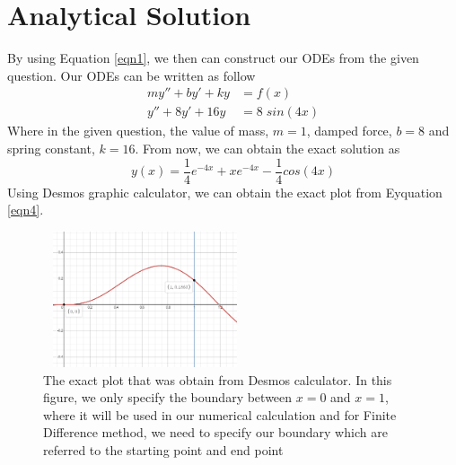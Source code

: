 \documentclass[a4paper,11.5 pt]{article}
\begin{document}
\section{Analytical Solution}
By using Equation \ref{eqn1}, we then can construct our ODEs from the given question. Our ODEs can be written as follow
\begin{align}
    my'' + by' + ky &= f(x)\\
    y'' + 8y' + 16y &= 8\;sin(4x) \label{eqn3}
\end{align}
Where in the given question, the value of mass, $m = 1$, damped force, $b = 8$ and spring constant, $k = 16$. From now, we can obtain the exact solution as
\begin{equation}\label{eqn4}
    y(x) = \frac{1}{4}e^{-4x} + xe^{-4x} - \frac{1}{4}cos(4x)
\end{equation}
Using Desmos graphic calculator, we can obtain the exact plot from Eyquation \ref{eqn4}. 
\begin{figure}[h]
    \centering
    \includegraphics[width=6cm,height=4cm]{diagram/plot between 0 and 1.PNG}
    \caption{The exact plot that was obtain from Desmos calculator. In this figure, we only specify the boundary between $x=0$ and $x=1$, where it will be used in our numerical calculation and for Finite Difference method, we need to specify our boundary which are referred to the starting point and end point }
    \label{fig:my_label}
\end{figure}
\end{document}
